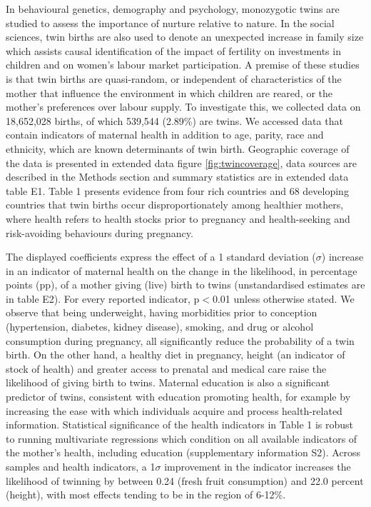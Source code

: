 \documentclass{nature}
\begin{document}
\begin{linenumbers}
In behavioural genetics, demography and psychology, monozygotic twins are studied to assess the importance of nurture relative to nature\cite{Thorndike1905,Boomsmaetal2002,Poldermanetal2015,Phillips1993,BouchardPropping1993,McClearnetal1997,Nisen2013}. In the social sciences, twin births are also used to denote an unexpected increase in family size which assists causal identification of the impact of fertility on investments in children and on women's labour market participation\cite{WolpinRosenzweig2000,RosenzweigWolpin1980,BronarsGrogger1994}. A premise of these studies is that twin births are quasi-random, or independent of characteristics of the mother that influence the environment in which children are reared, or the mother's preferences over labour supply. To investigate this, we collected data on 18,652,028 births, of which 539,544 (2.89\%) are twins. We accessed data that contain indicators of maternal health in addition to age, parity, race and ethnicity, which are known determinants of twin birth\cite{Bulmer1970}. Geographic coverage of the data is presented in extended data figure \ref{fig:twincoverage}, data sources are described in the Methods section and summary statistics are in extended data table E1. Table 1 presents evidence from four rich countries and 68 developing countries that twin births occur disproportionately among healthier mothers, where health refers to health stocks prior to pregnancy and health-seeking and risk-avoiding behaviours during pregnancy.

The displayed coefficients express the effect of a 1 standard deviation ($\sigma$) increase in an indicator of maternal health on the change in the likelihood, in percentage points (pp), of a mother giving (live) birth to twins (unstandardised estimates are in table E2). For every reported indicator, p$<$0.01 unless otherwise stated. We observe that being underweight, having morbidities prior to conception (hypertension, diabetes, kidney disease), smoking, and drug or alcohol consumption during pregnancy, all significantly reduce the probability of a twin birth. On the other hand, a healthy diet in pregnancy, height (an indicator of stock of health\cite{Silventoinen2003,BhalotraRawlings2013}) and greater access to prenatal and medical care raise the likelihood of giving birth to twins. Maternal education is also a significant predictor of twins, consistent with education promoting health, for example by increasing the ease with which individuals acquire and process health-related information\cite{Kenkel1991,CutlerLlerasMuney2010}. Statistical significance of the health indicators in Table 1 is robust to running multivariate regressions which condition on all available indicators of the mother's health, including education (supplementary information S2).  Across samples and health indicators, a 1$\sigma$ improvement in the indicator increases the likelihood of twinning by between 0.24 (fresh fruit consumption) and 22.0 percent (height), with most effects tending to be in the region of 6-12\%.


\end{linenumbers}
\end{document}
